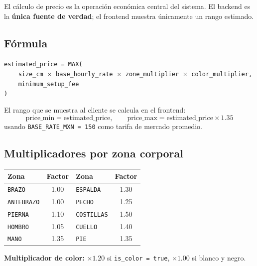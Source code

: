 \documentclass[11pt,a4paper]{article}
\begin{document}
El cálculo de precio es la operación económica central del sistema. El backend
es la \textbf{única fuente de verdad}; el frontend muestra únicamente un rango estimado.

\subsection{Fórmula}

\begin{tcolorbox}[codebox, title={Fórmula canónica (backend/apps/quotes/views.py)}]
\texttt{estimated\_price = MAX(}\\
\texttt{\ \ \ \ size\_cm $\times$ base\_hourly\_rate $\times$ zone\_multiplier $\times$ color\_multiplier,}\\
\texttt{\ \ \ \ minimum\_setup\_fee}\\
\texttt{)}
\end{tcolorbox}

El rango que se muestra al cliente se calcula en el frontend:
\[
\text{price\_min} = \text{estimated\_price}, \qquad
\text{price\_max} = \text{estimated\_price} \times 1.35
\]
usando \texttt{BASE\_RATE\_MXN = 150} como tarifa de mercado promedio.

\subsection{Multiplicadores por zona corporal}

\begin{center}
\begin{tabular}{lc|lc}
\toprule
\rowcolor{blkMid}\textcolor{blkGold}{\textbf{Zona}} & \textcolor{blkGold}{\textbf{Factor}} &
\textcolor{blkGold}{\textbf{Zona}} & \textcolor{blkGold}{\textbf{Factor}}\\
\midrule
\texttt{BRAZO}      & 1.00 & \texttt{ESPALDA}   & 1.30\\
\rowcolor{blkMid}
\texttt{ANTEBRAZO}  & 1.00 & \texttt{PECHO}     & 1.25\\
\texttt{PIERNA}     & 1.10 & \texttt{COSTILLAS} & 1.50\\
\rowcolor{blkMid}
\texttt{HOMBRO}     & 1.05 & \texttt{CUELLO}    & 1.40\\
\texttt{MANO}       & 1.35 & \texttt{PIE}       & 1.35\\
\bottomrule
\end{tabular}
\end{center}

\textbf{Multiplicador de color:} $\times 1.20$ si \texttt{is\_color = true}, $\times 1.00$ si blanco y negro.
\end{document}
